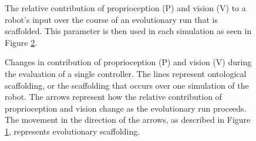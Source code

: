 \documentclass{sig-alternate}
\begin{document}
\begin{figure}[!t]
  \centering
  \caption{The relative contribution of proprioception (P) and vision (V) to a robot's input over the course of an evolutionary run that is scaffolded. This parameter is then used in each simulation as seen in Figure \ref{fig:scaffolding}.}
  \vspace{-0.3cm} 
  \label{fig:scaffolding_contribution}
\end{figure}
\begin{figure}[!t]
  \centering
  \vspace{-0.3cm} 
  \caption{Changes in contribution of proprioception (P) and vision (V) during the evaluation of a single controller. The lines represent ontological scaffolding, or the scaffolding that occurs over one simulation of the robot. The arrows represent how the relative contribution of proprioception and vision change as the evolutionary run proceeds. The movement in the direction of the arrows, as described in Figure \ref{fig:scaffolding_contribution}, represents evolutionary scaffolding.}
  \vspace{-0.5cm} 
  \label{fig:scaffolding}
\end{figure}
\end{document}
